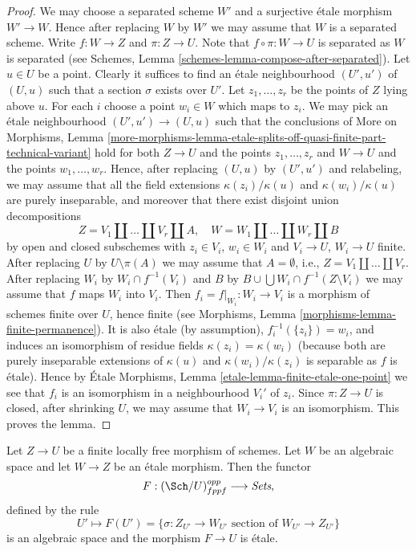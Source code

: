\begin{proof}
We may choose a separated scheme $W'$ and a surjective \'etale morphism
$W' \to W$. Hence after replacing $W$ by $W'$ we may assume that $W$
is a separated scheme. Write $f : W \to Z$ and $\pi : Z \to U$.
Note that $f \circ \pi : W \to U$ is separated as
$W$ is separated (see
Schemes, Lemma \ref{schemes-lemma-compose-after-separated}).
Let $u \in U$ be a point. Clearly it suffices
to find an \'etale neighbourhood $(U', u')$ of $(U, u)$ such that
a section $\sigma$ exists over $U'$. Let $z_1, \ldots, z_r$
be the points of $Z$ lying above $u$. For each $i$ choose a point
$w_i \in W$ which maps to $z_i$. We may pick an \'etale neighbourhood
$(U', u') \to (U, u)$ such that the conclusions of
More on Morphisms, Lemma
\ref{more-morphisms-lemma-etale-splits-off-quasi-finite-part-technical-variant}
hold for both $Z \to U$ and the points $z_1, \ldots, z_r$
and $W \to U$ and the points $w_1, \ldots, w_r$. Hence, after
replacing $(U, u)$ by $(U', u')$ and relabeling, we may assume that
all the field extensions $\kappa(z_i)/\kappa(u)$ and
$\kappa(w_i)/\kappa(u)$ are purely inseparable, and moreover
that there exist disjoint union decompositions
$$
Z = V_1 \amalg \ldots \amalg V_r \amalg A, \quad
W = W_1 \amalg \ldots \amalg W_r \amalg B
$$
by open and closed subschemes
with $z_i \in V_i$, $w_i \in W_i$ and $V_i \to U$, $W_i \to U$ finite.
After replacing $U$ by $U \setminus \pi(A)$ we may assume that
$A = \emptyset$, i.e., $Z = V_1 \amalg \ldots \amalg V_r$.
After replacing $W_i$ by $W_i \cap f^{-1}(V_i)$ and
$B$ by $B \cup \bigcup W_i \cap f^{-1}(Z \setminus V_i)$
we may assume that $f$ maps $W_i$ into $V_i$.
Then $f_i = f|_{W_i} : W_i \to V_i$ is a morphism of schemes finite over $U$,
hence finite (see
Morphisms, Lemma \ref{morphisms-lemma-finite-permanence}).
It is also \'etale (by assumption),
$f_i^{-1}(\{z_i\}) = w_i$, and induces an isomorphism of residue
fields $\kappa(z_i) = \kappa(w_i)$ (because both are purely inseparable
extensions of $\kappa(u)$ and $\kappa(w_i)/\kappa(z_i)$
is separable as $f$ is \'etale). Hence by
\'Etale Morphisms, Lemma \ref{etale-lemma-finite-etale-one-point}
we see that $f_i$ is an isomorphism in a neighbourhood $V_i'$ of
$z_i$. Since $\pi : Z \to U$ is closed, after shrinking $U$, we may assume
that $W_i \to V_i$ is an isomorphism. This proves the lemma.
\end{proof}

\begin{lemma}
\label{lemma-space-of-sections}
Let $Z \to U$ be a finite locally free morphism of schemes.
Let $W$ be an algebraic space and let $W \to Z$ be an \'etale morphism.
Then the functor
$$
F : (\Sch/U)_{fppf}^{opp} \longrightarrow \textit{Sets},
$$
defined by the rule
$$
U' \longmapsto
F(U') =
\{\sigma : Z_{U'} \to W_{U'}\text{ section of }W_{U'} \to Z_{U'}\}
$$
is an algebraic space and the morphism $F \to U$ is \'etale.
\end{lemma}

